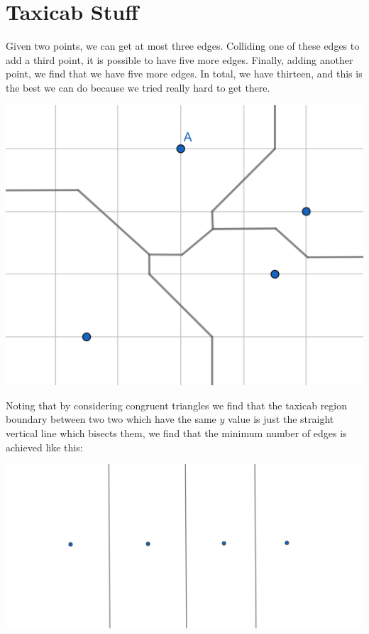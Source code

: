 \documentclass[12pt]{article}
\theoremstyle{definition}
\begin{document}
\section{ Taxicab Stuff }

Given two points, we can get at most three edges. Colliding one of these edges to add a third point, it is possible to have five more edges. Finally, adding another point, we find that we have five more edges. In total, we have thirteen, and this is the best we can do because we tried really hard to get there.

\includegraphics[scale=1]{taxicab.png} 

Noting that by considering congruent triangles we find that the taxicab region boundary between two two which have the same $y$ value is just the straight vertical line which bisects them, we find that the minimum number of edges is achieved like this:

\includegraphics[scale=0.5]{smallest_taxicab.png} 
\end{document}
